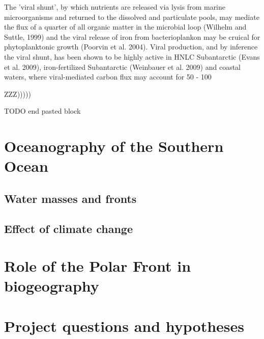 
The 'viral shunt', by which nutrients are released via lysis from marine microorganisms and returned to the dissolved and particulate pools, may mediate the flux of a quarter of all organic matter in the microbial loop (Wilhelm and Suttle, 1999) and the viral release of iron from bacterioplankon may be cruical for phytoplanktonic growth (Poorvin et al. 2004). Viral production, and by inference the viral shunt, has been shown to be highly active in HNLC Subantarctic (Evans et al. 2009), iron-fertilized Subantarctic (Weinbauer et al. 2009) and coastal waters, where viral-mediated carbon flux may account for 50 - 100%


ZZZ)))))


TODO end pasted block


\section{Oceanography of the Southern Ocean}


\subsection{Water masses and fronts}
\subsection{Effect of climate change}
\section{Role of the Polar Front in biogeography}
\section{Project questions and hypotheses}
